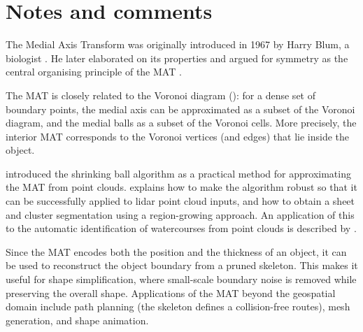 
\section{Notes and comments}
The Medial Axis Transform was originally introduced in 1967 by Harry Blum, a biologist \citep{Blum67}. He later elaborated on its properties and argued for symmetry as the central organising principle of the MAT \citep{Blum73}.

The MAT is closely related to the Voronoi diagram (): for a dense set of boundary points, the medial axis can be approximated as a subset of the Voronoi diagram, and the medial balls as a subset of the Voronoi cells. More precisely, the interior MAT corresponds to the Voronoi vertices (and edges) that lie inside the object.

\citet{Ma12} introduced the shrinking ball algorithm as a practical method for approximating the MAT from point clouds. \citet{Peters18} explains how to make the algorithm robust so that it can be successfully applied to lidar point cloud inputs, and how to obtain a sheet and cluster segmentation using a region-growing approach. An application of this to the automatic identification of watercourses from point clouds is described by \citet{Broersen17}.

Since the MAT encodes both the position and the thickness of an object, it can be used to reconstruct the object boundary from a pruned skeleton. This makes it useful for shape simplification, where small-scale boundary noise is removed while preserving the overall shape. Applications of the MAT beyond the geospatial domain include path planning (the skeleton defines a collision-free routes), mesh generation, and shape animation.



